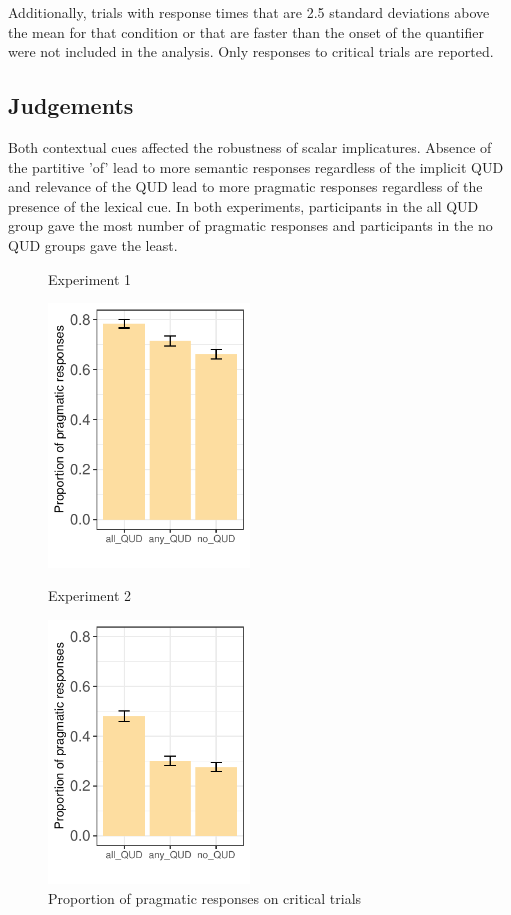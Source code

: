 \documentclass[12pt]{article}
\begin{document}
Additionally, trials with response times that are 2.5 standard deviations above the mean for that condition or that are faster than the onset of the quantifier were not included in the analysis. Only responses to critical trials are reported. 


\subsection*{Judgements}

Both contextual cues affected the robustness of scalar implicatures. Absence of the partitive 'of' lead to more semantic responses regardless of the implicit QUD and relevance of the QUD lead to more pragmatic responses regardless of the presence of the lexical cue. In both experiments, participants in the all QUD group gave the most number of pragmatic responses and participants in the no QUD groups gave the least.

\begin{figure}[!ht]  
\begin{minipage}{.5\textwidth}
    \caption*{Experiment 1}
    \includegraphics[height=7cm]{img/exp4_proportion_pragmatic.pdf}    
    \end{minipage}%
\begin{minipage}{.5\textwidth}
    \caption*{Experiment 2}
    \includegraphics[height=7cm]{img/exp5_proportion_pragmatic.pdf}
    \end{minipage}%
    \caption{Proportion of pragmatic responses on critical trials}
\end{figure}
\end{document}
